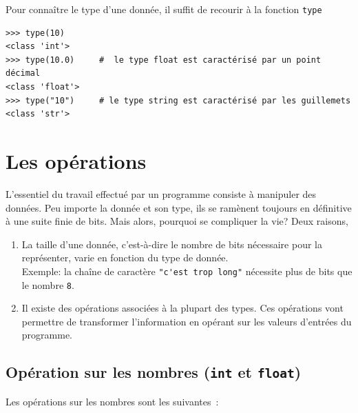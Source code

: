 \documentclass[11pt, a4paper]{book}
\begin{document}
\begin{apprendre}
	Pour connaître le type d’une donnée, il suffit de recourir à la fonction \lstinline{type}
	\begin{lstlisting}[numbers=none]
>>> type(10)
<class 'int'>
>>> type(10.0)     #  le type float est caractérisé par un point décimal
<class 'float'>
>>> type("10")     # le type string est caractérisé par les guillemets
<class 'str'>
	\end{lstlisting}
\end{apprendre}


\section{Les opérations}
L’essentiel du travail effectué par un programme consiste à manipuler des données. Peu importe la donnée et son type, ils se ramènent toujours en définitive à une suite finie de bits. Mais alors, pourquoi se compliquer la vie? Deux raisons,
\begin{enumerate}
	\item La taille d'une donnée, c'est-à-dire le nombre de bits nécessaire pour la représenter, varie en fonction du type de donnée.\\
	Exemple: la chaîne de caractère \lstinline{"c'est trop long"} nécessite plus de bits que le nombre  \lstinline{8}.
	\item Il existe des opérations associées à la plupart des types. Ces opérations vont permettre de transformer l'information en opérant sur les valeurs d'entrées du programme.
\end{enumerate}


\subsection{Opération sur les nombres (\lstinline{int} et \lstinline{float})}
Les opérations sur les nombres sont les suivantes :
\end{document}
